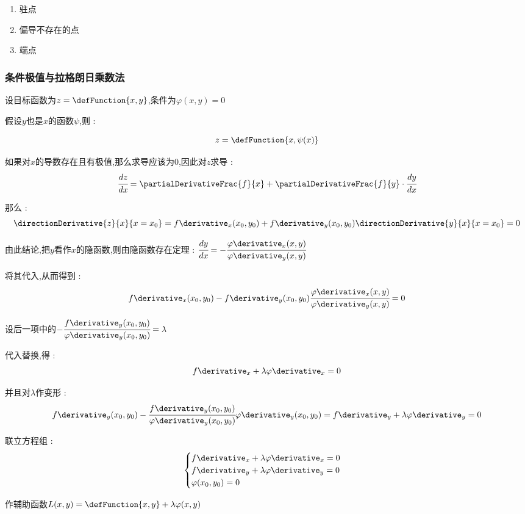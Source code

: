 {{{    \begin{enumerate}
      \item 驻点
      \item 偏导不存在的点
      \item 端点
    \end{enumerate}
  }%

  \subsubsection{条件极值与拉格朗日乘数法}{
    设目标函数为$z = \defFunction{x,y}$,条件为$\varphi(x,y) = 0$

    假设$y$也是$x$的函数$\psi$,则 :

    $$
      z = \defFunction{x,\psi(x)}
    $$

    如果对$x$的导数存在且有极值,那么求导应该为$0$,因此对$z$求导 :
    $$
      \cfrac{dz}{dx} = \partialDerivativeFrac{f}{x} + \partialDerivativeFrac{f}{y}\cdot\cfrac{dy}{dx}
    $$

    那么 :
    $$
      \directionDerivative{z}{x}{x = x_0} = f\derivative_x(x_0,y_0) + f\derivative_y(x_0,y_0)\directionDerivative{y}{x}{x = x_0} = 0
    $$

    由此结论,把$y$看作$x$的隐函数,则由隐函数存在定理 : $\cfrac{dy}{dx} = -\cfrac{\varphi\derivative_x(x,y)}{\varphi\derivative_y(x,y)}$

    将其代入,从而得到 :
    $$
      f\derivative_x(x_0,y_0) - f\derivative_y(x_0,y_0)\cfrac{\varphi\derivative_x(x,y)}{\varphi\derivative_y(x,y)} = 0
    $$

    设后一项中的$-\cfrac{f\derivative_y(x_0,y_0)}{\varphi\derivative_y(x_0,y_0)} = \lambda$

    代入替换,得 :
    $$
      f\derivative_x + \lambda\varphi\derivative_x = 0
    $$

    并且对$\lambda$作变形 :
    $$
      f\derivative_y(x_0,y_0) - \cfrac{f\derivative_y(x_0,y_0)}{\varphi\derivative_y(x_0,y_0)}\varphi\derivative_y(x_0,y_0) = f\derivative_y + \lambda\varphi\derivative_y = 0
    $$

    联立方程组 :
    $$
      \begin{cases}
        f\derivative_x + \lambda\varphi\derivative_x = 0 \\
        f\derivative_y + \lambda\varphi\derivative_y = 0 \\
        \varphi(x_0,y_0) = 0
      \end{cases}
    $$

    作辅助函数$L(x,y) = \defFunction{x,y} + \lambda\varphi(x,y)$

}}}
